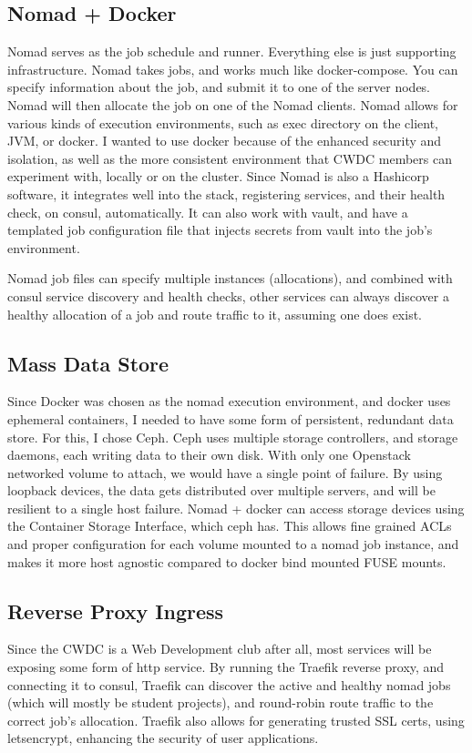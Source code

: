 \documentclass{article}
\begin{document}
\subsection{Nomad + Docker}
Nomad serves as the job schedule and runner. Everything else is just supporting infrastructure. Nomad takes jobs, and works much like docker-compose. You can specify information about the job, and submit it to one of the server nodes. Nomad will then allocate the job on one of the Nomad clients. Nomad allows for various kinds of execution environments, such as exec directory on the client, JVM, or docker. I wanted to use docker because of the enhanced security and isolation, as well as the more consistent environment that CWDC members can experiment with, locally or on the cluster. Since Nomad is also a Hashicorp software, it integrates well into the stack, registering services, and their health check, on consul, automatically. It can also work with vault, and have a templated job configuration file that injects secrets from vault into the job's environment.

Nomad job files can specify multiple instances (allocations), and combined with consul service discovery and health checks, other services can always discover a healthy allocation of a job and route traffic to it, assuming one does exist. 
\subsection{Mass Data Store}
Since Docker was chosen as the nomad execution environment, and docker uses ephemeral containers, I needed to have some form of persistent, redundant data store. For this, I chose Ceph. Ceph uses multiple storage controllers, and storage daemons, each writing data to their own disk. With only one Openstack networked volume to attach, we would have a single point of failure. By using loopback devices, the data gets distributed over multiple servers, and will be resilient to a single host failure. Nomad + docker can access storage devices using the Container Storage Interface, which ceph has. This allows fine grained ACLs and proper configuration for each volume mounted to a nomad job instance, and makes it more host agnostic compared to docker bind mounted FUSE mounts.
\subsection{Reverse Proxy Ingress}
Since the CWDC is a Web Development club after all, most services will be exposing some form of http service. By running the Traefik reverse proxy, and connecting it to consul, Traefik can discover the active and healthy nomad jobs (which will mostly be student projects), and round-robin route traffic to the correct job's allocation. Traefik also allows for generating trusted SSL certs, using letsencrypt, enhancing the security of user applications.
\end{document}
